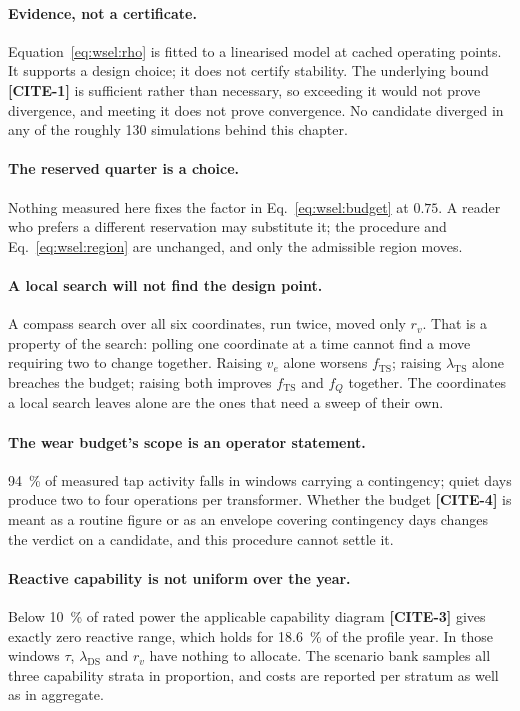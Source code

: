 \documentclass[11pt,a4paper]{article}
\newcommand{\lamts}{\ensuremath{\lambda_{\mathrm{TS}}}}
\newcommand{\lamds}{\ensuremath{\lambda_{\mathrm{DS}}}}
\newcommand{\fts}{\ensuremath{f_{\mathrm{TS}}}}
\newcommand{\fq}{\ensuremath{f_{Q}}}
\newcommand{\CITE}[1]{\textbf{[CITE-#1]}}
\begin{document}
\paragraph{Evidence, not a certificate.}
Equation~\eqref{eq:wsel:rho} is fitted to a linearised model at cached operating
points. It supports a design choice; it does not certify stability. The
underlying bound \CITE{1} is sufficient rather than necessary, so exceeding it
would not prove divergence, and meeting it does not prove convergence. No
candidate diverged in any of the roughly \num{130} simulations behind this
chapter.

\paragraph{The reserved quarter is a choice.}
Nothing measured here fixes the factor in Eq.~\eqref{eq:wsel:budget} at $0.75$.
A reader who prefers a different reservation may substitute it; the procedure
and Eq.~\eqref{eq:wsel:region} are unchanged, and only the admissible region
moves.

\paragraph{A local search will not find the design point.}
A compass search over all six coordinates, run twice, moved only $r_v$. That is
a property of the search: polling one coordinate at a time cannot find a move
requiring two to change together. Raising $v_e$ alone worsens \fts; raising
\lamts{} alone breaches the budget; raising both improves \fts{} and \fq{}
together. The coordinates a local search leaves alone are the ones that need a
sweep of their own.

\paragraph{The wear budget's scope is an operator statement.}
\SI{94}{\percent} of measured tap activity falls in windows carrying a
contingency; quiet days produce two to four operations per transformer. Whether
the budget \CITE{4} is meant as a routine figure or as an envelope covering
contingency days changes the verdict on a candidate, and this procedure cannot
settle it.

\paragraph{Reactive capability is not uniform over the year.}
Below \SI{10}{\percent} of rated power the applicable capability diagram
\CITE{3} gives exactly zero reactive range, which holds for \SI{18.6}{\percent}
of the profile year. In those windows $\tau$, \lamds{} and $r_v$ have nothing to
allocate. The scenario bank samples all three capability strata in proportion,
and costs are reported per stratum as well as in aggregate.
\end{document}
